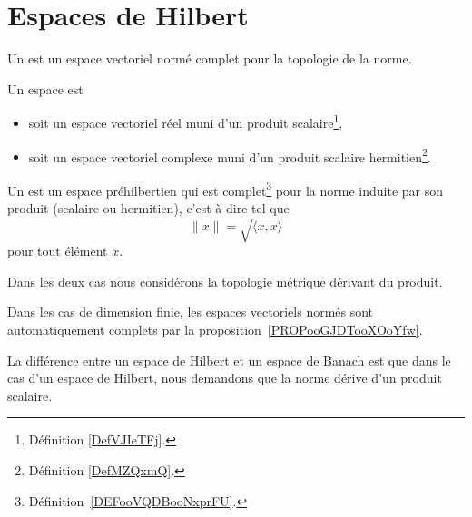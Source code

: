 
\section{Espaces de Hilbert}

\begin{definition}  \label{DefVKuyYpQ}
    Un  est un espace vectoriel normé complet pour la topologie de la norme.
\end{definition}

\begin{definition}  \label{DefORuBdBN}
    Un espace  est
    \begin{itemize}
        \item soit un espace vectoriel réel muni d'un produit scalaire\footnote{Définition \ref{DefVJIeTFj}.},
        \item soit un espace vectoriel complexe muni d'un produit scalaire hermitien\footnote{Définition \ref{DefMZQxmQ}.}.
    \end{itemize}
    Un  est un espace préhilbertien qui est complet\footnote{Définition~\ref{DEFooVQDBooNxprFU}.} pour la norme induite par son produit (scalaire ou hermitien), c'est à dire tel que
    \begin{equation}
        \| x \|=\sqrt{ \langle x, x\rangle  }
    \end{equation}
    pour tout élément \( x\).

    Dans les deux cas nous considérons la topologie métrique dérivant du produit.
\end{definition}

Dans les cas de dimension finie, les espaces vectoriels normés sont automatiquement complets par la proposition~\ref{PROPooGJDTooXOoYfw}.

La différence entre un espace de Hilbert et un espace de Banach est que dans le cas d'un espace de Hilbert, nous demandons que la norme dérive d'un produit scalaire.

